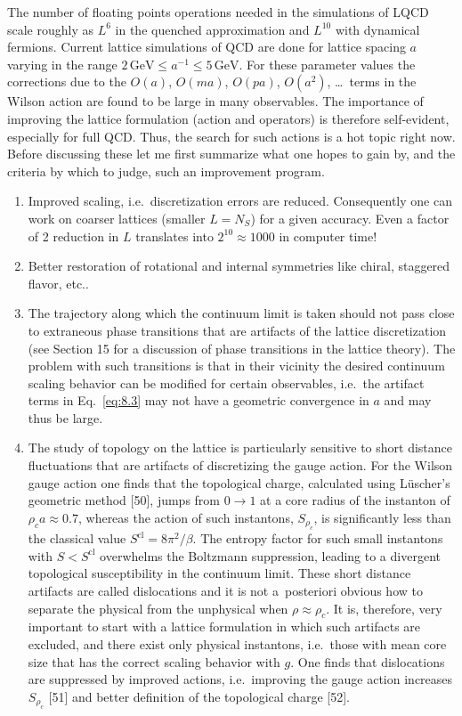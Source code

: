The number of floating points operations needed in the simulations of LQCD
scale roughly as $L^6$ in the quenched approximation and $L^{10}$ with
dynamical fermions. Current lattice simulations of QCD are done for lattice
spacing $a$ varying in the range $2\,\mathrm{GeV} \leq a^{-1} \leq
5\,\mathrm{GeV}$. For these parameter values the corrections due to the
$O(a)$, $O(ma)$, $O(pa)$, $O(a^2)$, \ldots\ terms in the Wilson action are
found to be large in many observables. The importance of improving the
lattice formulation (action and operators) is therefore self-evident,
especially for full QCD. Thus, the search for such actions is a hot topic
right now. Before discussing these let me first summarize what one hopes to
gain by, and the criteria by which to judge, such an improvement program.
\begin{enumerate}
\item Improved scaling, i.e.\ discretization errors are reduced. Consequently
one can work on coarser lattices (smaller $L = N_S$) for a given accuracy.
Even a factor of 2 reduction in $L$ translates into $2^{10} \approx 1000$ in
computer time!

\item Better restoration of rotational and internal symmetries like chiral,
staggered flavor, etc..

\item The trajectory along which the continuum limit is taken should not pass
close to extraneous phase transitions that are artifacts of the lattice
discretization (see Section 15 for a discussion of phase transitions in the
lattice theory). The problem with such transitions is that in their vicinity
the desired continuum scaling behavior can be modified for certain
observables, i.e.\ the artifact terms in Eq.~\ref{eq:8.3} may not have a
geometric convergence in $a$ and may thus be large.

\item The study of topology on the lattice is particularly sensitive to short
distance fluctuations that are artifacts of discretizing the gauge action.
For the Wilson gauge action one finds that the topological charge, calculated
using L\"uscher's geometric method [50], jumps from $0 \to 1$ at a core
radius of the instanton of $\rho_c a \approx 0.7$, whereas the action of such
instantons, $S_{\rho_c}$, is significantly less than the classical value
$S^{\mathrm{cl}} = 8\pi^2/\beta$. The entropy factor for such small
instantons with $S < S^{\mathrm{cl}}$ overwhelms the Boltzmann suppression,
leading to a divergent topological susceptibility in the continuum limit.
These short distance artifacts are called dislocations and it is not
a~posteriori obvious how to separate the physical from the unphysical when
$\rho \approx \rho_c$. It is, therefore, very important to start with a
lattice formulation in which such artifacts are excluded, and there exist
only physical instantons, i.e.\ those with mean core size that has the
correct scaling behavior with $g$. One finds that dislocations are suppressed
by improved actions, i.e.\ improving the gauge action increases $S_{\rho_c}$
[51] and better definition of the topological charge [52].


\end{enumerate}
